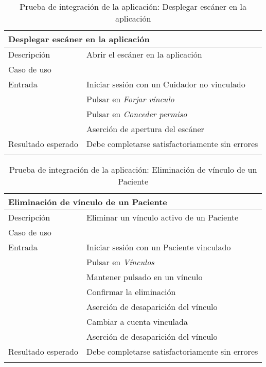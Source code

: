 \vspace{-10pt}
\begin{longtable}{|p{} p{}|}
    \hline
    \multicolumn{2}{|l|}{\textbf{Desplegar escáner en la aplicación}} \\ \hline 
    Descripción                 & Abrir el escáner en la aplicación \\ \hline
    Caso de uso                 & \nameref{cu:vincular_cuidador} \\ \hline
    Entrada                     & Iniciar sesión con un Cuidador no vinculado \\
                                & Pulsar en \emph{Forjar vínculo} \\
                                & Pulsar en \emph{Conceder permiso} \\
                                & Aserción de apertura del escáner \\ \hline
    Resultado esperado          & Debe completarse satisfactoriamente sin errores \\ \hline
    \caption{Prueba de integración de la aplicación: Desplegar escáner en la aplicación}
    \label{cp:i:app:desplegar_escaner}
\end{longtable}

\vspace{-10pt}
\begin{longtable}{|p{} p{}|}
    \hline
    \multicolumn{2}{|l|}{\textbf{Eliminación de vínculo de un Paciente}} \\ \hline 
    Descripción                 & Eliminar un vínculo activo de un Paciente \\ \hline
    Caso de uso                 & \nameref{cu:desvincular} \\ \hline
    Entrada                     & Iniciar sesión con un Paciente vinculado \\
                                & Pulsar en \emph{Vínculos} \\
                                & Mantener pulsado en un vínculo \\
                                & Confirmar la eliminación \\
                                & Aserción de desaparición del vínculo \\
                                & Cambiar a cuenta vinculada \\
                                & Aserción de desaparición del vínculo \\ \hline
    Resultado esperado          & Debe completarse satisfactoriamente sin errores \\ \hline
    \caption{Prueba de integración de la aplicación: Eliminación de vínculo de un Paciente}
    \label{cp:i:app:eliminiacion_vinculo_paciente}
\end{longtable}

